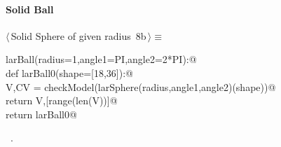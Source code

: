 \documentclass[11pt,oneside]{article}	%
\begin{document}
\paragraph{Solid Ball}
\begin{flushleft} \small \label{scrap14}
\protect{}$\langle\,$Solid Sphere of given radius\nobreak\ {\footnotesize 8b}$\,\rangle\equiv$
\vspace{-1ex}
\begin{list}{}{} \item
\mbox{}\verb@def larBall(radius=1,angle1=PI,angle2=2*PI):@\\
\mbox{}\verb@   def larBall0(shape=[18,36]):@\\
\mbox{}\verb@      V,CV = checkModel(larSphere(radius,angle1,angle2)(shape))@\\
\mbox{}\verb@      return V,[range(len(V))]@\\
\mbox{}\verb@   return larBall0@\\
\mbox{}\verb@@{\NWsep}
\end{list}
\vspace{-1ex}
\footnotesize\addtolength{\baselineskip}{-1ex}
\begin{list}{}{\setlength{\itemsep}{-\parsep}\setlength{\itemindent}{-\leftmargin}}
\item \NWtxtMacroRefIn\ .
\end{list}
\end{flushleft}
\end{document}

